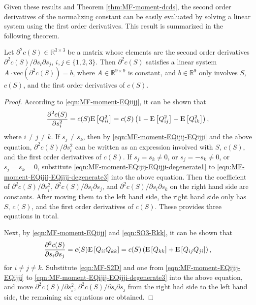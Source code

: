 Given these results and Theorem \ref{thm:MF-moment-dcds}, the second order derivatives of the normalizing constant can be easily evaluated by solving a linear system using the first order derivatives.
This result is summarized in the following theorem.
\begin{theorem} \label{thm:MF-moment-dcds-second}
	Let $\partial^2 c(S) \in \mathbb{R}^{3\times 3}$ be a matrix whose elements are the second order derivatives $\partial^2 c(S)/\partial s_i \partial s_j$, $i,j\in\{1,2,3\}$.
	Then $\partial^2 c(S)$ satisfies a linear system $A \cdot \mathrm{vec}(\partial^2 c(S)) = b$, where $A\in\mathbb{R}^{9\times 9}$ is constant, and $b\in\mathbb{R}^9$ only involves $S$, $c(S)$, and the first order derivatives of $c(S)$.
\end{theorem}
\begin{proof}
	According to \eqref{eqn:MF-moment-EQiijj}, it can be shown that
	\begin{align*}
		\frac{\partial^2 c(S)}{\partial s_i^2} = c(S)\mathrm{E}\left[ Q_{ii}^2 \right] = c(S)\left(1-\mathrm{E}\left[ Q_{ij}^2 \right]-\mathrm{E}\left[ Q_{ik}^2 \right]\right),
	\end{align*}
	where $i\neq j\neq k$.
	If $s_j\neq s_k$, then by \eqref{eqn:MF-moment-EQijij-EQijji} and the above equation, $\partial^2 c(S)/\partial s_i^2$ can be written as an expression involved with $S$, $c(S)$, and the first order derivatives of $c(S)$.
	If $s_j=s_k\neq 0$, or $s_j=-s_k\neq 0$, or $s_j=s_k=0$, substitute \eqref{eqn:MF-moment-EQijij-EQijji-degenerate1} to \eqref{eqn:MF-moment-EQijij-EQijji-degenerate3} into the above equation.
	Then the coefficient of $\partial^2 c(S)/\partial s_i^2$, $\partial^2 c(S)/\partial s_i \partial s_j$, and $\partial^2 c(S)/\partial s_i \partial s_k$ on the right hand side are constants.
	After moving them to the left hand side, the right hand side only has $S$, $c(S)$, and the first order derivatives of $c(S)$.
	These provides three equations in total.
	
	Next, by \eqref{eqn:MF-moment-EQiijj} and \eqref{eqn:SO3-Rkk}, it can be shown that
	\begin{align*}
		\frac{\partial^2 c(S)}{\partial s_i \partial s_j} = c(S)\mathrm{E}\left[ Q_{ii}Q_{kk} \right] = c(S)\left(\mathrm{E}\left[ Q_{kk} \right]+\mathrm{E}\left[ Q_{ij}Q_{ji} \right]\right),
	\end{align*}
	for $i\neq j\neq k$.
	Substitute \eqref{eqn:MF-S2D} and one from \eqref{eqn:MF-moment-EQijij-EQijji} to \eqref{eqn:MF-moment-EQijij-EQijji-degenerate3} into the above equation, and move $\partial^2 c(S)/\partial s_i^2$, $\partial^2 c(S)/\partial s_i \partial s_j$ from the right had side to the left hand side, the remaining six equations are obtained.
\end{proof}

